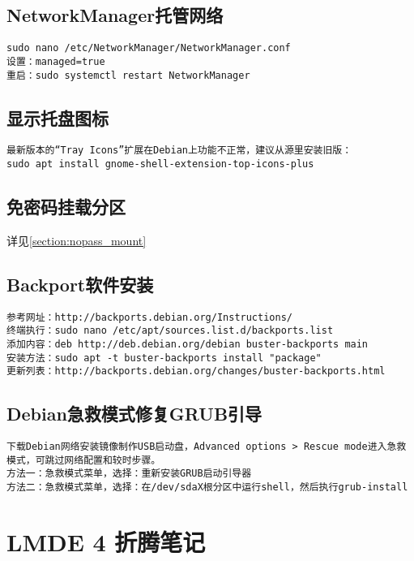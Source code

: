 \documentclass[a4paper,fontset=fandol,zihao=-4,linespread=1.2,oneside]{ctexbook}
\begin{document}
\section{NetworkManager托管网络}
\begin{lstlisting}
sudo nano /etc/NetworkManager/NetworkManager.conf
设置：managed=true
重启：sudo systemctl restart NetworkManager
\end{lstlisting}

\section{显示托盘图标}
\begin{lstlisting}
最新版本的“Tray Icons”扩展在Debian上功能不正常，建议从源里安装旧版：
sudo apt install gnome-shell-extension-top-icons-plus
\end{lstlisting}

\section{免密码挂载分区}
详见\ref{section:nopass_mount}

\section{Backport软件安装}
\begin{lstlisting}
参考网址：http://backports.debian.org/Instructions/
终端执行：sudo nano /etc/apt/sources.list.d/backports.list
添加内容：deb http://deb.debian.org/debian buster-backports main
安装方法：sudo apt -t buster-backports install "package"
更新列表：http://backports.debian.org/changes/buster-backports.html
\end{lstlisting}

\section{Debian急救模式修复GRUB引导}
\begin{lstlisting}
下载Debian网络安装镜像制作USB启动盘，Advanced options > Rescue mode进入急救模式，可跳过网络配置和较时步骤。
方法一：急救模式菜单，选择：重新安装GRUB启动引导器
方法二：急救模式菜单，选择：在/dev/sdaX根分区中运行shell，然后执行grub-install
\end{lstlisting}


\chapter{LMDE 4 折腾笔记}
\end{document}
